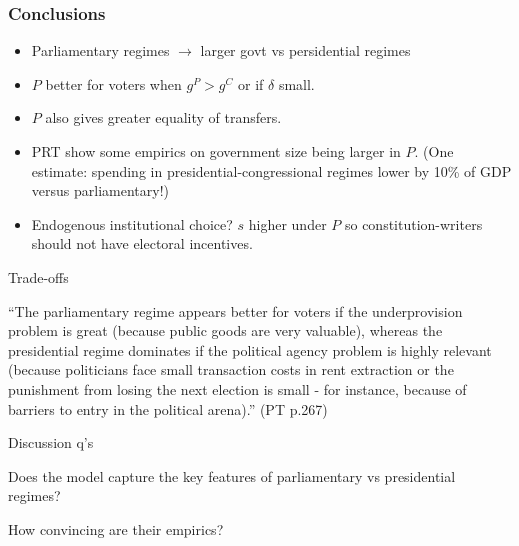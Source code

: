 \documentclass[11pt,aspectratio=169]{beamer}
\begin{document}
\begin{frame}
\frametitle{Conclusions}


\begin{itemize}
\item Parliamentary regimes $\rightarrow$ larger govt vs persidential regimes
\item $P$ better for voters when $g^P > g^C$ or if $\delta$ small.
\item $P$ also gives greater equality of transfers.
\item PRT show some empirics on government size being larger in $P$. (One estimate: spending in presidential-congressional regimes lower by 10\% of GDP versus parliamentary!)
\item Endogenous institutional choice? $s$ higher under $P$ so constitution-writers should not have electoral incentives.
\end{itemize}

\end{frame}

\begin{frame}{Trade-offs}

``The parliamentary regime appears better for voters if the underprovision problem is great (because public goods are very valuable), whereas the presidential regime dominates if the political agency problem is highly relevant (because politicians face small transaction costs in rent extraction or the punishment from losing the next election is small - for instance, because of barriers to entry in the political arena).'' (PT p.267)

\end{frame}

\begin{frame}{Discussion q's}

\begin{tcolorbox}
Does the model capture the key features of parliamentary vs presidential regimes?
\end{tcolorbox}

\vspace{3em}
\begin{tcolorbox}
How convincing are their empirics?
\end{tcolorbox}

\end{frame}
\end{document}
